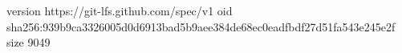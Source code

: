 version https://git-lfs.github.com/spec/v1
oid sha256:939b9ca3326005d0d6913bad5b9aee384de68ec0eadfbdf27d51fa543e245e2f
size 9049
